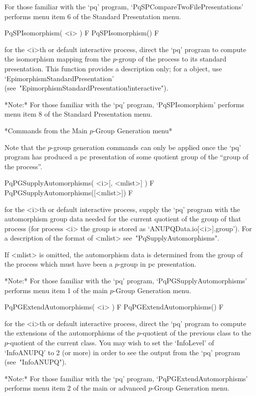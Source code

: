 For      those      familiar      with       the       `pq'       program,
`PqSPCompareTwoFilePresentations' performs menu item 6  of  the  Standard
Presentation menu.

\>PqSPIsomorphism( <i> ) F
\>PqSPIsomorphism() F

for the <i>th or default interactive {\ANUPQ} process,  direct  the  `pq'
program to compute the isomorphism mapping  from  the  $p$-group  of  the
process  to  its  standard  presentation.  This   function   provides   a
description      only;      for      a      {\GAP}      object,       use
`EpimorphismStandardPresentation'
(see~"EpimorphismStandardPresentation!interactive").

*Note:* For  those  familiar  with  the  `pq'  program,  `PqSPIsomorphism'
performs menu item 8 of the Standard Presentation menu.

*Commands from the Main $p$-Group Generation menu*

Note that the $p$-group generation commands can only be applied once  the
`pq' program has produced a pc presentation of some quotient group of the
``group of the process''.

\>PqPGSupplyAutomorphisms( <i>[, <mlist>] ) F
\>PqPGSupplyAutomorphisms([<mlist>]) F

for the  <i>th or default  interactive {\ANUPQ} process, supply  the `pq'
program with the automorphism group  data needed for the current quotient
of the  group of  that process (for  process <i>  the group is  stored as
`ANUPQData.io[<i>].group').  For  a description of the  format of <mlist>
see~"PqSupplyAutomorphisms".

If <mlist> is omitted, the automorphism data is determined from the group
of  the process  which must  have been  a $p$-group  in  pc presentation.

*Note:*
For  those  familiar  with  the  `pq'  program,  `PqPGSupplyAutomorphisms'
performs menu item 1 of the main $p$-Group Generation menu.

\>PqPGExtendAutomorphisms( <i> ) F
\>PqPGExtendAutomorphisms() F

for the <i>th  or default interactive {\ANUPQ} process,  direct  the `pq'
program  to   compute  the  extensions   of  the  automorphisms   of  the
$p$-quotient of  the previous  class to the  $p$-quotient of  the current
class.  You may wish to set the `InfoLevel' of `InfoANUPQ' to 2 (or more)
in order to see the output from the `pq' program (see~"InfoANUPQ").

*Note:*    
For  those  familiar  with  the  `pq'  program,  `PqPGExtendAutomorphisms'
performs menu item 2 of the main or advanced $p$-Group Generation menu. 

